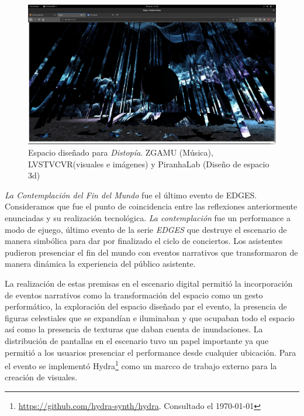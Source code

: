 \begin{figure}
  \includegraphics[width=\textwidth]{img/edges4.png}
  \caption{Espacio diseñado para \emph{Distopía}. ZGAMU (Música), LVSTVCVR(visuales e imágenes) y PiranhaLab (Diseño de espacio 3d)}
  \label{fig:distopia}
\end{figure}



\textit{La Contemplación del Fin del Mundo} fue el último evento de EDGES. Consideramos que fue el punto de coincidencia entre las reflexiones anteriormente enunciadas y su realización tecnológica. \textit{La contemplación} fue un performance a modo de ejuego, último evento de la serie \textit{EDGES} que destruye el escenario de manera simbólica para dar por finalizado el ciclo de conciertos. Los asistentes pudieron presenciar el fin del mundo con eventos narrativos que transformaron de manera dinámica la experiencia del público asistente. 

La realización de estas premisas en el escenario digital permitió la incorporación de eventos narrativos como la transformación del espacio como un gesto performático, la exploración del espacio diseñado par el evento, la presencia de figuras celestiales que se expandían e iluminaban y que ocupaban todo el espacio así como la presencia de texturas que daban cuenta de inundaciones. La distribución de pantallas en el escenario tuvo un papel importante ya que permitió a los usuarios presenciar el performance desde cualquier ubicación. Para el evento se implementó Hydra\footnote{\url{https://github.com/hydra-synth/hydra}. Consultado el \today} como un marcco de trabajo externo para la creación de visuales.

